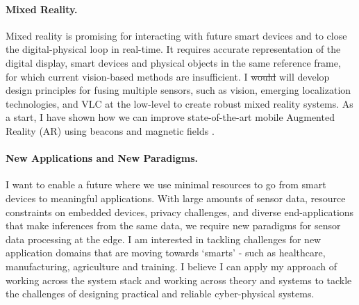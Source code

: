 \documentclass[10pt]{article}
\begin{document}
\paragraph{Mixed Reality. }
Mixed reality is promising for interacting with future smart devices and to close the digital-physical loop in real-time. It requires accurate representation of the digital display, smart devices and physical objects in the same reference frame, for which current vision-based methods are insufficient.
I \st{would} will develop design principles for fusing multiple sensors, such as vision, emerging localization technologies, and VLC at the low-level to create robust mixed reality systems. As a start, I have shown how we can improve state-of-the-art mobile Augmented Reality (AR) using beacons and magnetic fields \cite{mobileAR}. %


\paragraph{New Applications and New Paradigms. }
I want to enable a future where we use minimal resources to go from smart devices to meaningful applications. 
With large amounts of sensor data, resource constraints on embedded devices, privacy challenges, and diverse end-applications that make	 inferences from the same data, we require new paradigms for 
sensor data processing at the edge. %
I am interested in tackling challenges for new application domains that are moving towards `smarts' - such as healthcare, manufacturing, agriculture and training. 
I believe I can apply my approach of working across the system stack and working across theory and systems %
to tackle the challenges of designing practical and reliable cyber-physical systems. 








\footnotesize


\end{document}
